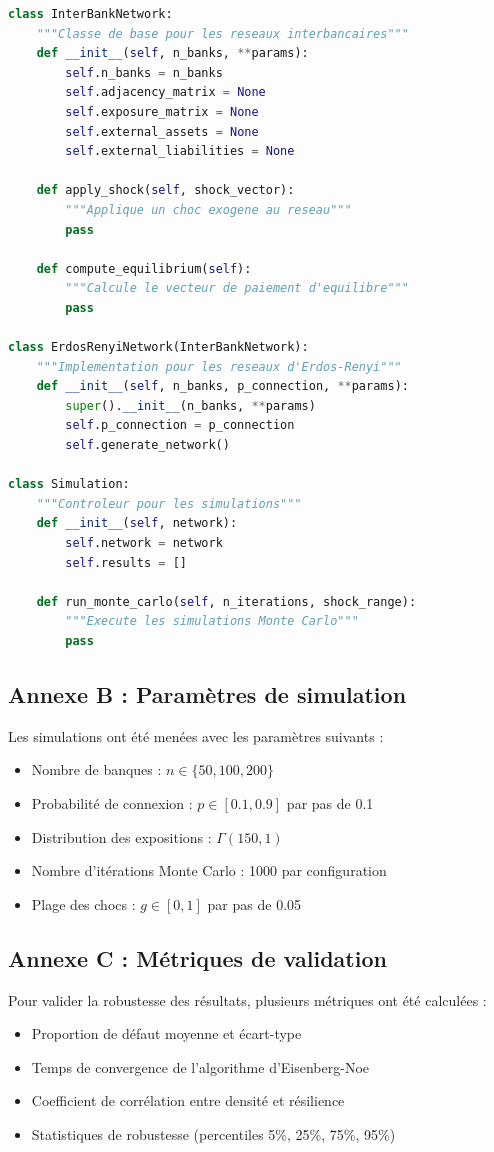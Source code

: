 \documentclass[12pt,a4paper,twoside]{article}
\begin{document}
\begin{lstlisting}[language=Python, caption=Structure principale du simulateur]
class InterBankNetwork:
    """Classe de base pour les reseaux interbancaires"""
    def __init__(self, n_banks, **params):
        self.n_banks = n_banks
        self.adjacency_matrix = None
        self.exposure_matrix = None
        self.external_assets = None
        self.external_liabilities = None
    
    def apply_shock(self, shock_vector):
        """Applique un choc exogene au reseau"""
        pass
    
    def compute_equilibrium(self):
        """Calcule le vecteur de paiement d'equilibre"""
        pass

class ErdosRenyiNetwork(InterBankNetwork):
    """Implementation pour les reseaux d'Erdos-Renyi"""
    def __init__(self, n_banks, p_connection, **params):
        super().__init__(n_banks, **params)
        self.p_connection = p_connection
        self.generate_network()

class Simulation:
    """Controleur pour les simulations"""
    def __init__(self, network):
        self.network = network
        self.results = []
    
    def run_monte_carlo(self, n_iterations, shock_range):
        """Execute les simulations Monte Carlo"""
        pass
\end{lstlisting}

\subsection*{Annexe B : Paramètres de simulation}

Les simulations ont été menées avec les paramètres suivants :

\begin{itemize}
\item Nombre de banques : $n \in \{50, 100, 200\}$
\item Probabilité de connexion : $p \in [0.1, 0.9]$ par pas de 0.1
\item Distribution des expositions : $\Gamma(150, 1)$
\item Nombre d'itérations Monte Carlo : 1000 par configuration
\item Plage des chocs : $g \in [0, 1]$ par pas de 0.05
\end{itemize}

\subsection*{Annexe C : Métriques de validation}

Pour valider la robustesse des résultats, plusieurs métriques ont été calculées :

\begin{itemize}
\item Proportion de défaut moyenne et écart-type
\item Temps de convergence de l'algorithme d'Eisenberg-Noe
\item Coefficient de corrélation entre densité et résilience
\item Statistiques de robustesse (percentiles 5\%, 25\%, 75\%, 95\%)
\end{itemize}
\end{document}
